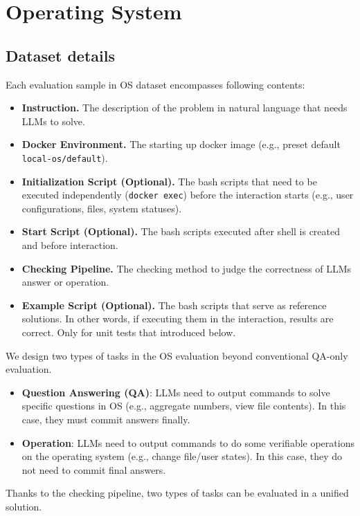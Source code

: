 \section{Operating System} \label{app:os}
\subsection{Dataset details}
Each evaluation sample in OS dataset encompasses following contents:

\begin{itemize}[leftmargin=1.5em,itemsep=0pt,parsep=0.2em,topsep=0.0em,partopsep=0.0em]
    \item \textbf{Instruction.} The description of the problem in natural language that needs LLMs to solve.
    \item \textbf{Docker Environment.} The starting up docker image (e.g., preset default \texttt{local-os/default}).
    \item \textbf{Initialization Script (Optional).} The bash scripts that need to be executed independently (\texttt{docker exec}) before the interaction starts (e.g., user configurations, files, system statuses).
    \item \textbf{Start Script (Optional).} The bash scripts executed after shell is created and before interaction.
    \item \textbf{Checking Pipeline.} The checking method to judge the correctness of LLMs answer or operation.
    \item \textbf{Example Script (Optional).} The bash scripts that serve as reference solutions. In other words, if executing them in the interaction, results are correct. Only for unit tests that introduced below.
\end{itemize}



We design two types of tasks in the OS evaluation beyond conventional QA-only evaluation.
\begin{itemize}[leftmargin=1.5em,itemsep=0pt,parsep=0.2em,topsep=0.0em,partopsep=0.0em]
    \item \textbf{Question Answering (QA)}: LLMs need to output commands to solve specific questions in OS (e.g., aggregate numbers, view file contents). In this case, they must commit answers finally.
    \item \textbf{Operation}: LLMs need to output commands to do some verifiable operations on the operating system (e.g., change file/user states). In this case, they do not need to commit final answers. 
\end{itemize}
Thanks to the checking pipeline, two types of tasks can be evaluated in a unified solution.

